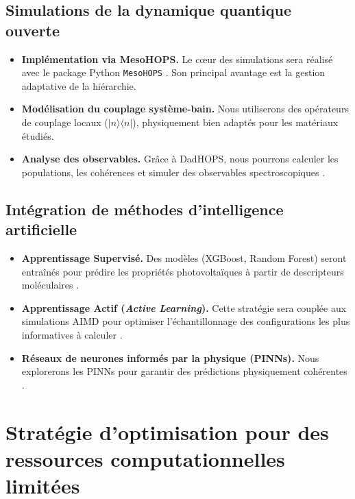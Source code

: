 \documentclass[12pt, a4paper]{article}
\begin{document}
\subsection{Simulations de la dynamique quantique ouverte}

\begin{itemize}
    \item \textbf{Implémentation via MesoHOPS.} Le cœur des simulations sera réalisé avec le package Python \texttt{MesoHOPS} \cite{Citty2024}. Son principal avantage est la gestion adaptative de la hiérarchie.

    \item \textbf{Modélisation du couplage système-bain.} Nous utiliserons des opérateurs de couplage locaux ($|n\rangle\langle n|$), physiquement bien adaptés pour les matériaux étudiés.

    \item \textbf{Analyse des observables.} Grâce à DadHOPS, nous pourrons calculer les populations, les cohérences et simuler des observables spectroscopiques \cite{Gera2023, Chen2022a}.
\end{itemize}

\subsection{Intégration de méthodes d'intelligence artificielle}

\begin{itemize}
    \item \textbf{Apprentissage Supervisé.} Des modèles (XGBoost, Random Forest) seront entraînés pour prédire les propriétés photovoltaïques à partir de descripteurs moléculaires \cite{liu2022}.

    \item \textbf{Apprentissage Actif (\textit{Active Learning}).} Cette stratégie sera couplée aux simulations AIMD pour optimiser l'échantillonnage des configurations les plus informatives à calculer \cite{yati2025}.

    \item \textbf{Réseaux de neurones informés par la physique (PINNs).} Nous explorerons les PINNs pour garantir des prédictions physiquement cohérentes \cite{Ullah2024}.
\end{itemize}

\section{Stratégie d'optimisation pour des ressources computationnelles limitées}
\end{document}
